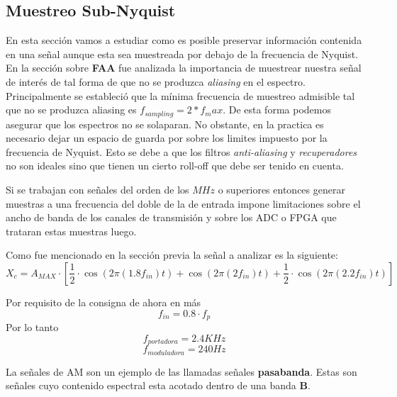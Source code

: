 %

%
	\subsection{Muestreo Sub-Nyquist}
En esta sección vamos a estudiar como es posible preservar información contenida en una señal aunque esta sea muestreada por debajo de la frecuencia de Nyquist.
En la sección sobre \textbf{FAA} fue analizada la importancia de muestrear nuestra señal de interés de tal forma de que no se produzca \textit{aliasing} en el espectro. Principalmente se estableció que la mínima frecuencia de muestreo admisible tal que no se produzca aliasing es $f_{sampling}= 2*f_max$. De esta forma podemos asegurar que los espectros no se solaparan. No obstante, en la practica es necesario dejar un espacio de guarda por sobre los limites impuesto por la frecuencia de Nyquist. Esto se debe a que los filtros \textit{anti-aliasing} y \textit{recuperadores} no son ideales sino que tienen un cierto roll-off que debe ser tenido en cuenta.

Si se trabajan con señales del orden de los $MHz$ o superiores entonces generar muestras a una frecuencia del doble de la de entrada impone limitaciones sobre el ancho de banda de los canales de transmisión y sobre los ADC o FPGA que trataran estas muestras luego.


Como fue mencionado en la sección previa la señal a analizar es la siguiente:
\begin{equation}
X_c = A_{MAX} \cdot \left[ \frac{1}{2} \cdot \cos (2 \pi (1.8 f_{in}) t) +\cos (2 \pi (2 f_{in}) t)  + \frac{1}{2} \cdot \cos (2 \pi (2.2 f_{in}) t) \right]
\end{equation}

Por requisito de la consigna de ahora en más
$$f_{in} = 0.8\cdot f_{p} $$
Por lo tanto
$$f_{portadora} = 2.4KHz$$
$$f_{moduladora} = 240Hz$$

La señales de AM son un ejemplo de las llamadas señales \textbf{pasabanda}. Estas son señales cuyo contenido espectral esta acotado dentro de una banda \textbf{B}.
